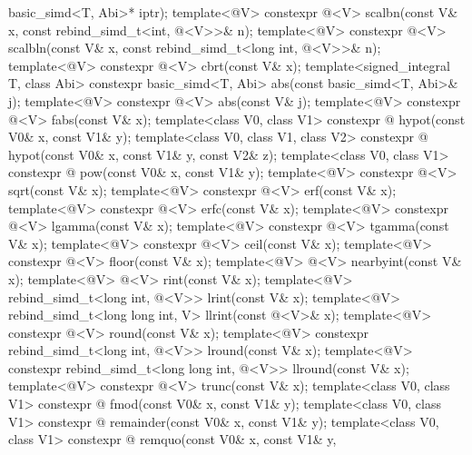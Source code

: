 \begin{codeblock}
{                                      basic_simd<T, Abi>* iptr);
  template<@\mathfloatingpoint@ V> constexpr @\deducedsimd@<V> scalbn(const V& x, const
  rebind_simd_t<int, @\deducedsimd@<V>>& n);
  template<@\mathfloatingpoint@ V>
    constexpr @\deducedsimd@<V> scalbln(const V& x, const rebind_simd_t<long int, @\deducedsimd@<V>>& n);
  template<@\mathfloatingpoint@ V> constexpr @\deducedsimd@<V> cbrt(const V& x);
  template<signed_integral T, class Abi>
    constexpr basic_simd<T, Abi> abs(const basic_simd<T, Abi>& j);
  template<@\mathfloatingpoint@ V> constexpr @\deducedsimd@<V> abs(const V& j);
  template<@\mathfloatingpoint@ V> constexpr @\deducedsimd@<V> fabs(const V& x);
  template<class V0, class V1>
    constexpr @ hypot(const V0& x, const V1& y);
  template<class V0, class V1, class V2>
    constexpr @ hypot(const V0& x, const V1& y, const V2& z);
  template<class V0, class V1>
    constexpr @ pow(const V0& x, const V1& y);
  template<@\mathfloatingpoint@ V> constexpr @\deducedsimd@<V> sqrt(const V& x);
  template<@\mathfloatingpoint@ V> constexpr @\deducedsimd@<V> erf(const V& x);
  template<@\mathfloatingpoint@ V> constexpr @\deducedsimd@<V> erfc(const V& x);
  template<@\mathfloatingpoint@ V> constexpr @\deducedsimd@<V> lgamma(const V& x);
  template<@\mathfloatingpoint@ V> constexpr @\deducedsimd@<V> tgamma(const V& x);
  template<@\mathfloatingpoint@ V> constexpr @\deducedsimd@<V> ceil(const V& x);
  template<@\mathfloatingpoint@ V> constexpr @\deducedsimd@<V> floor(const V& x);
  template<@\mathfloatingpoint@ V> @\deducedsimd@<V> nearbyint(const V& x);
  template<@\mathfloatingpoint@ V> @\deducedsimd@<V> rint(const V& x);
  template<@\mathfloatingpoint@ V> rebind_simd_t<long int, @\deducedsimd@<V>> lrint(const V& x);
  template<@\mathfloatingpoint@ V> rebind_simd_t<long long int, V> llrint(const @\deducedsimd@<V>& x);
  template<@\mathfloatingpoint@ V> constexpr @\deducedsimd@<V> round(const V& x);
  template<@\mathfloatingpoint@ V> constexpr rebind_simd_t<long int, @\deducedsimd@<V>> lround(const V& x);
  template<@\mathfloatingpoint@ V> constexpr rebind_simd_t<long long int, @\deducedsimd@<V>> llround(const V& x);
  template<@\mathfloatingpoint@ V> constexpr @\deducedsimd@<V> trunc(const V& x);
  template<class V0, class V1>
    constexpr @ fmod(const V0& x, const V1& y);
  template<class V0, class V1>
    constexpr @ remainder(const V0& x, const V1& y);
  template<class V0, class V1>
    constexpr @ remquo(const V0& x, const V1& y,
}
\end{codeblock}
